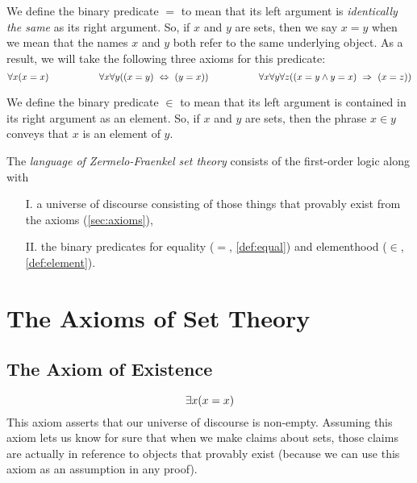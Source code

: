 \begin{definition}[Equality]\label{def:equal}
    We define the binary predicate \(=\) to mean that
    its left argument is \emph{identically the same} as its right argument.
    So, if \(x\) and \(y\) are sets, then we say \(x = y\)
    when we mean that the names \(x\) and \(y\) both refer to the same underlying object.
    As a result, we will take the following three axioms for this predicate:
    \vspace{-\parskip}
    \[
        \forall x \pn*{x = x}
        ~~~~~~~~~~~~~~~~
        \forall x \forall y \pn*{\pn*{x = y} \iff \pn*{y = x}}
        ~~~~~~~~~~~~~~~~
        \forall x \forall y \forall z \pn*{\pn*{x = y \meet y = x} \implies \pn*{x = z}}
    \]
    \vspace{-\parskip-\abovedisplayskip}
\end{definition}

\begin{definition}[Elementhood]\label{def:element}
    We define the binary predicate \(\in\) to mean that its left argument is
    contained in its right argument as an element.
    So, if \(x\) and \(y\) are sets, then the phrase \(x \in y\)
    conveys that \(x\) is an element of \(y\).
\end{definition}

\begin{definition}
    The \emph{language of Zermelo-Fraenkel set theory}
    consists of the first-order logic
    along with
    \begin{enumerate}
        \item[I.]
            a universe of discourse consisting of
            those things that provably exist from the axioms (\autoref{sec:axioms}),
        \item[II.]
            the binary predicates for equality (\(=\), \autoref{def:equal})
            and elementhood (\(\in\), \autoref{def:element}).
    \end{enumerate}
\end{definition}

\section{The Axioms of Set Theory}\label{sec:axioms}
\setcounter{axiom}{-1}

\subsection{The Axiom of Existence}
\begin{axiom}[Existence]\label{ax:existence}
    \[
        \exists x \pn*{x = x}
    \]
    This axiom asserts that our universe of discourse is non-empty.
    Assuming this axiom lets us know for sure that when we make claims about sets,
    those claims are actually in reference to objects that provably exist
    (because we can use this axiom as an assumption in any proof).
\end{axiom}

